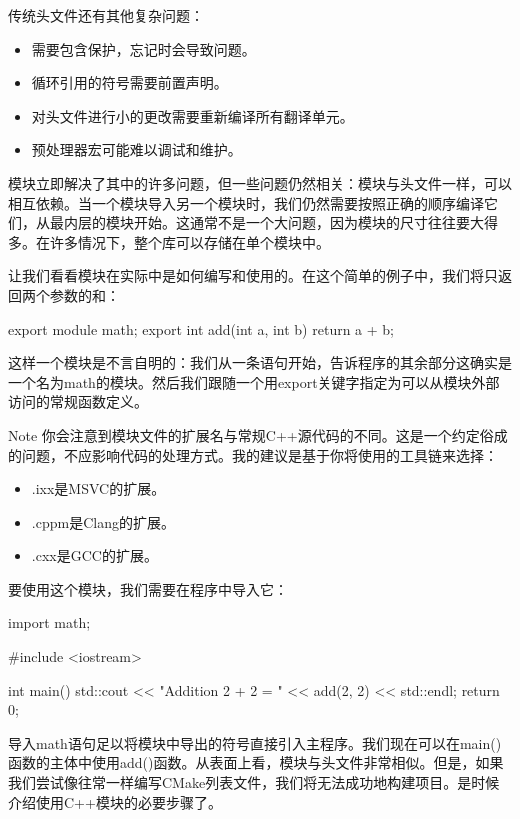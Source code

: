 传统头文件还有其他复杂问题：

\begin{itemize}
\item
需要包含保护，忘记时会导致问题。

\item
循环引用的符号需要前置声明。

\item
对头文件进行小的更改需要重新编译所有翻译单元。

\item
预处理器宏可能难以调试和维护。
\end{itemize}

模块立即解决了其中的许多问题，但一些问题仍然相关：模块与头文件一样，可以相互依赖。当一个模块导入另一个模块时，我们仍然需要按照正确的顺序编译它们，从最内层的模块开始。这通常不是一个大问题，因为模块的尺寸往往要大得多。在许多情况下，整个库可以存储在单个模块中。

让我们看看模块在实际中是如何编写和使用的。在这个简单的例子中，我们将只返回两个参数的和：


\begin{cpp}
export module math;
export int add(int a, int b) {
    return a + b;
}
\end{cpp}

这样一个模块是不言自明的：我们从一条语句开始，告诉程序的其余部分这确实是一个名为math的模块。然后我们跟随一个用export关键字指定为可以从模块外部访问的常规函数定义。

\begin{myNotic}{Note}
你会注意到模块文件的扩展名与常规C++源代码的不同。这是一个约定俗成的问题，不应影响代码的处理方式。我的建议是基于你将使用的工具链来选择：

\begin{itemize}
\item
.ixx是MSVC的扩展。

\item
.cppm是Clang的扩展。

\item
.cxx是GCC的扩展。
\end{itemize}
\end{myNotic}

要使用这个模块，我们需要在程序中导入它：


\begin{cpp}
import math;

#include <iostream>

int main() {
    std::cout << "Addition 2 + 2 = " << add(2, 2) << std::endl;
    return 0;
}
\end{cpp}

导入math语句足以将模块中导出的符号直接引入主程序。我们现在可以在main()函数的主体中使用add()函数。从表面上看，模块与头文件非常相似。但是，如果我们尝试像往常一样编写CMake列表文件，我们将无法成功地构建项目。是时候介绍使用C++模块的必要步骤了。









